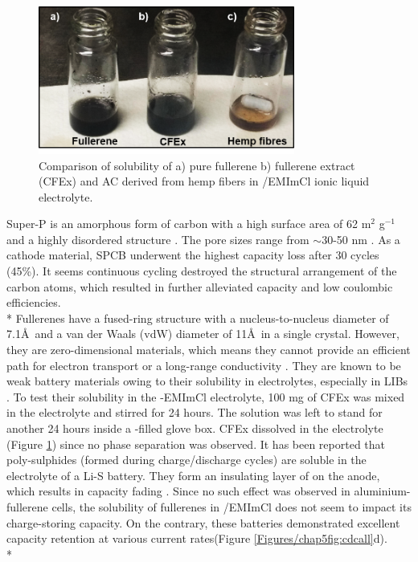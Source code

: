 \begin{figure}[h]
\centering
\includegraphics[width=0.75\textwidth]{Figures/chap5fig/cfexsol}
\caption{Comparison of solubility of a) pure  fullerene b) fullerene extract (CFEx) and AC derived from hemp fibers in /EMImCl ionic liquid electrolyte.}
\label{Figures/chap5fig:cfexsol}
\end{figure}

Super-P is an amorphous form of carbon with a high surface area of 62 m$^2$ g$^{-1}$ and a highly disordered structure \cite{see_reversible_2017}. The pore sizes range from $\sim$30-50 nm \cite{younesi_analysis_2015}. As a cathode material, SPCB underwent the highest capacity loss after 30 cycles (45\%). It seems continuous cycling destroyed the structural arrangement of the carbon atoms, which resulted in further alleviated capacity and low coulombic efficiencies.\\*
Fullerenes have a fused-ring structure with a nucleus-to-nucleus diameter of 7.1\AA\ and a van der Waals (vdW) diameter of 11\AA\ in a single crystal. However, they are zero-dimensional materials, which means they cannot provide an efficient path for electron transport or a long-range conductivity \cite{winkler_two-component_2007}. They are known to be weak battery materials owing to their solubility in electrolytes, especially in LIBs \cite{seger_prospects_1991}. To test their solubility in the -EMImCl electrolyte, 100 mg of CFEx was mixed in the electrolyte and stirred for 24 hours. The solution was left to stand for another 24 hours inside a -filled glove box. CFEx dissolved in the electrolyte (Figure \ref{Figures/chap5fig:cfexsol}) since no phase separation was observed. It has been reported that poly-sulphides (formed during charge/discharge cycles) are soluble in the electrolyte of a Li-S battery. They form an insulating layer of  on the anode, which results in capacity fading \cite{sun_effect_2017}. Since no such effect was observed in aluminium-fullerene cells, the solubility of fullerenes in /EMImCl does not seem to impact its charge-storing capacity. On the contrary, these batteries demonstrated excellent capacity retention at various current rates(Figure \ref{Figures/chap5fig:cdcall}d).\\*

